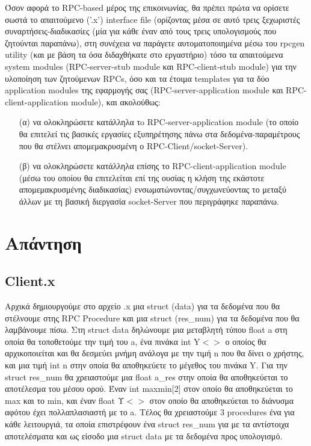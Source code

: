 \noindent
Όσον αφορά το RPC-based μέρος της επικοινωνίας, θα πρέπει πρώτα να ορίσετε σωστά το απαιτούμενο ('.x') interface file (ορίζοντας μέσα σε αυτό τρεις ξεχωριστές συναρτήσεις-διαδικασίες (μία για κάθε έναν από τους τρεις υπολογισμούς που ζητούνται παραπάνω), στη συνέχεια να παράγετε αυτοματοποιημένα μέσω του rpcgen utility (και με βάση τα όσα διδαχθήκατε στο εργαστήριο) τόσο τα απαιτούμενα system modules (RPC-server-stub module και RPC-client-stub module) για την υλοποίηση των ζητούμενων RPCs, όσο και τα έτοιμα templates για τα δύο application modules της εφαρμογής σας (RPC-server-application module και RPC-client-application module), και ακολούθως: 

\begin{itemize}
	\item[(α)]να ολοκληρώσετε κατάλληλα τo RPC-server-application module (το οποίο θα επιτελεί τις βασικές εργασίες εξυπηρέτησης πάνω στα δεδομένα-παραμέτρους που θα στέλνει απομεμακρυσμένη ο RPC-Client/socket-Server).
	\item[(β)]να ολοκληρώσετε κατάλληλα επίσης το RPC-client-application module (μέσω του οποίου θα επιτελείται επί της ουσίας η κλήση της εκάστοτε απομεμακρυσμένης διαδικασίας) ενσωματώνοντας/συγχωνεύοντας το μεταξύ άλλων με τη βασική διεργασία socket-Server που περιγράφηκε παραπάνω.
\end{itemize}

\section{Απάντηση}

\noindent
\subsection{Client.x}
\noindent
Αρχικά δημιουργούμε στο αρχείο .x μια struct (data) για τα δεδομένα που θα στέλνουμε στης RPC Procedure 
και μια struct (res\_num) για τα δεδομένα που θα λαμβάνουμε πίσω. Στη struct data δηλώνουμε μια μεταβλητή τύπου
float a στη οποία θα τοποθετούμε την τιμή του a, ένα πινάκα int Y\(<>\) ο οποίος θα αρχικοποιείται 
και θα δεσμεύει μνήμη ανάλογα με την τιμή n που θα δίνει ο χρήστης, και μια τιμή int n στην οποία θα αποθηκεύετε 
το μέγεθος του πινάκα Y. Για την struct res\_num θα χρειαστούμε μια float a\_res στην οποία θα αποθηκεύεται το
αποτέλεσμα του μέσου ορού. Έναν int maxmin[2] στον οποίο θα αποθηκεύεται το max και το min, και έναν float Υ\(<>\)
στον οποίο θα αποθηκεύεται το διάνυσμα αφότου έχει πολλαπλασιαστή με το a. Τέλος θα χρειαστούμε 3 procedures
ένα για κάθε λειτουργιά, τα οποία επιστρέφουν ένα struct res\_num για με τα αντίστοιχα αποτελέσματα και ως είσοδο
μια struct data με τα δεδομένα προς υπολογισμό. 

